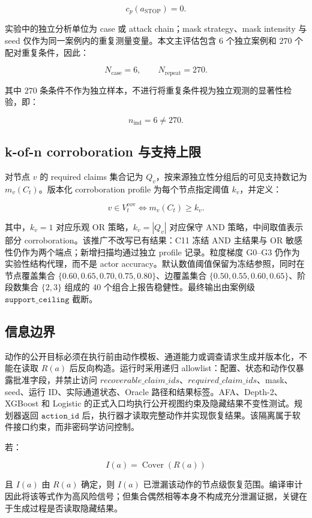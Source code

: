 \documentclass[conference,a4paper,10pt]{IEEEtran}
\begin{document}
\[
c_p(a_{\mathrm{STOP}})=0.
\]

实验中的独立分析单位为 case 或 attack chain；mask strategy、mask intensity 与 seed 仅作为同一案例内的重复测量变量。本文主评估包含 \(6\) 个独立案例和 \(270\) 个配对重复条件，因此：

\[
N_{\mathrm{case}}=6,\qquad N_{\mathrm{repeat}}=270 .
\]

其中 \(270\) 条条件不作为独立样本，不进行将重复条件视为独立观测的显著性检验，即：

\[
n_{\mathrm{ind}}=6\neq270 .
\]

\subsection{k-of-n corroboration 与支持上限}

对节点 \(v\) 的 required claims 集合记为 \(Q_v\)，按来源独立性分组后的可见支持数记为 \(m_v(C_t)\)。版本化 corroboration profile 为每个节点指定阈值 \(k_v\)，并定义：

\[
v\in V_t^{\mathrm{cov}}
\Longleftrightarrow
m_v(C_t)\geq k_v .
\]

其中，\(k_v=1\) 对应乐观 OR 策略，\(k_v=|Q_v|\) 对应保守 AND 策略，中间取值表示部分 corroboration。该推广不改写已有结果：C11 冻结 AND 主结果与 OR 敏感性仍作为两个端点；新增扫描均通过独立 profile 记录。粒度梯度 G0--G3 仍作为实验性结构代理，而不是 actor accuracy。默认数值阈值保留为冻结参照，同时在节点覆盖集合 \(\{0.60,0.65,0.70,0.75,0.80\}\)、边覆盖集合 \(\{0.50,0.55,0.60,0.65\}\)、阶段数集合 \(\{2,3\}\) 组成的 40 个组合上报告稳健性。最终输出由案例级 \(\texttt{support\_ceiling}\) 截断。


\subsection{信息边界}

动作的公开目标必须在执行前由动作模板、通道能力或调查请求生成并版本化，不能在读取 \(R(a)\) 后反向构造。运行时采用递归 allowlist：配置、状态和动作仅暴露批准字段，并禁止访问 \(recoverable\_claim\_ids\)、\(required\_claim\_ids\)、mask、seed、运行 ID、实际通道状态、Oracle 路径和结果标签。AFA、Depth-2、XGBoost 和 Logistic 的正式入口均执行公开视图约束及隐藏结果不变性测试。规划器返回 \(\texttt{action\_id}\) 后，执行器才读取完整动作并实现恢复结果。该隔离属于软件接口约束，而非密码学访问控制。

若：

\[
I(a)=\operatorname{Cover}(R(a))
\]

且 \(I(a)\) 由 \(R(a)\) 确定，则 \(I(a)\) 已泄漏该动作的节点级恢复范围。编译审计因此将该等式作为高风险信号；但集合偶然相等本身不构成充分泄漏证据，关键在于生成过程是否读取隐藏结果。
\end{document}
